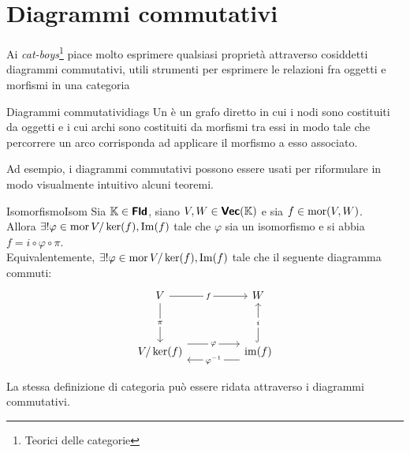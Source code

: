 \documentclass{article}
\begin{document}
\section{Diagrammi commutativi}
\label{sec:Diagrams}

Ai \textit{cat-boys}\footnote{Teorici delle categorie} piace molto esprimere qualsiasi proprietà attraverso cosiddetti diagrammi commutativi, utili strumenti per esprimere le relazioni fra oggetti e morfismi in una categoria

\begin{definition}{Diagrammi commutativi}{diags}
    Un  è un grafo diretto in cui i nodi sono costituiti da oggetti e i cui archi sono costituiti da morfismi tra essi in modo tale che percorrere un arco corrisponda ad applicare il morfismo a esso associato. 
\end{definition}

Ad esempio, i diagrammi commutativi possono essere usati per riformulare in modo visualmente intuitivo alcuni teoremi.

\begin{theorem}{Isomorfismo}{Isom}
    Sia $\mathbb{K} \in \text{\sffamily\textbf{Fld}}$, siano $V,W \in \text{\sffamily\textbf{Vec}}(\mathbb{K})$ e sia $f \in \operatorname{mor}(V,W)$.\\
    Allora $\exists! \varphi \in \operatorname{mor}{V/\ker(f), \operatorname{Im}(f)}$ tale che $\varphi$ sia un isomorfismo e si abbia $f = i \circ \varphi \circ \pi$.\\
    Equivalentemente, $\exists! \varphi \in \operatorname{mor}{V/\ker(f), \operatorname{Im}(f)}$ tale che il seguente diagramma commuti:
    \[\begin{tikzcd}
        V && W \\
        \\
        {V/\ker(f)} && {\operatorname{im}(f)}
        \arrow["f"{description}, from=1-1, to=1-3]
        \arrow["\pi"{description}, from=1-1, to=3-1]
        \arrow["\varphi"{description}, shift left=3, from=3-1, to=3-3]
        \arrow["i"{description}, hook, from=3-3, to=1-3]
        \arrow["{\varphi^{-1}}"{description}, shift left=3, from=3-3, to=3-1]
    \end{tikzcd}\]
\end{theorem}

La stessa definizione di categoria può essere ridata attraverso i diagrammi commutativi.
\end{document}
